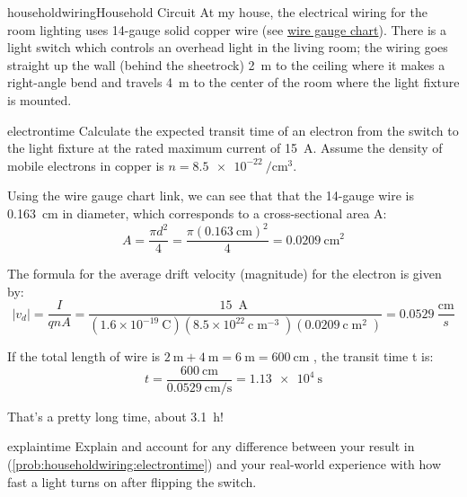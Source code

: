 \begin{mainquestion}{householdwiring}{Household Circuit}
At my house, the electrical wiring for the room lighting uses 14-gauge solid copper wire (see \href{https://www.engineeringtoolbox.com/awg-wire-gauge-d_731.html}{wire gauge chart}). There is a light switch which controls an overhead light in the living room; the wiring goes straight up the wall (behind the sheetrock) \qty{2}{\meter} to the ceiling where it makes a right-angle bend and travels \qty{4}{\meter} to the center of the room where the light fixture is mounted.

\begin{partquestion}{electrontime}
{Calculate the expected transit time of an electron from the switch to the light fixture at the rated maximum current of \qty{15}{\ampere}. Assume the density of mobile electrons in copper is $n = \qty{8.5e-22}{\per\centi\meter\cubed}$.}

\begin{answer}
Using the wire gauge chart link, we can see that that the 14-gauge wire is \qty{0.163}{\centi\meter} in diameter, which corresponds to a cross-sectional area A: 
\[
A = \frac{\pi d^2}{4}
  = \frac{\pi (\qty{0.163}{\centi\meter})^2}{4}
  = \qty{0.0209}{\centi\meter\squared}
\]

The formula for the average drift velocity (magnitude) for the electron is given by:
\[
\left|v_d\right|=\frac{I}{qnA}=\frac{15\mathrm{\ \operatorname{A}} }{\left(1.6\times10^{-19}\mathrm{\ C} \right)\left(8.5\times10^{22}\mathrm{\ c} \mathrm{\operatorname{m}}^{-3}\right)\left(0.0209\mathrm{\ c}\mathrm{\operatorname{m}}^2\right)}=0.0529\ \frac{\mathrm{cm} }{s}
\]

If the total length of wire is $\qty{2}{\meter} + \qty{4}{\meter} = \qty{6}{\meter} = \qty{600}{\centi\meter}$ , the transit time t is:
\[
t = \frac{\qty{600}{\centi\meter}}{\qty{0.0529}{\centi\meter\per\second}}
  = \qty{1.13e4}{\second}
\]

That's a pretty long time, about \qty{3.1}{\hour}!
\end{answer}
\end{partquestion}

\begin{partquestion}{explaintime}
{Explain and account for any difference between your result in (\cref{prob:householdwiring:electrontime}) and your real-world experience with how fast a light turns on after flipping the switch.}


\end{partquestion}
\end{mainquestion}
